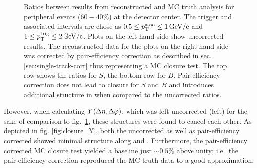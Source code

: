 \begin{figure}
\begin{subfigure}[b]{0.5\textwidth}
  \end{subfigure}
  \caption[Ratios between results from reconstructed and MC truth analysis for peripheral events ($60-40\%$) at the detector center.]{Ratios between results from reconstructed and MC truth analysis for peripheral events ($60-40\%$) at the detector center. The trigger and associated intervals are chose as $0.5 \le p_{\text{T}}^{\text{asso}} \le \SI{1}{GeV/c}$ and $1 \le p_{\text{T}}^{\text{trig}} \le \SI{2}{GeV/c}$. Plots on the left hand side show uncorrected results. The reconstructed data for the plots on the right hand side was corrected by pair-efficiency correction as described in sec. \ref{sec:single-track-corr} thus representing a MC closure test. The top row shows the ratios for $S$, the bottom row for $B$. Pair-efficiency correction does not lead to closure for $S$ and $B$ and introduces additional structure in \dphi when compared to the uncorrected ratios.}
  \label{fig:closures}
\end{figure}

However, when calculating $Y(\Delta\eta, \Delta\varphi)$, which was left uncorrected (left) for the sake of comparison to fig.~\ref{fig:closures},  these structures were found to cancel each other. As depicted in fig. \ref{fig:closure_Y}, both the uncorrected as well as pair-efficiency corrected \Y showed minimal structure along \deta and \dphi. Furthermore, the pair-efficiency corrected MC closure test yielded a baseline just $\sim 0.5\%$ above unity; i.e.\ the pair-efficiency correction reproduced the MC-truth data to a good approximation.

